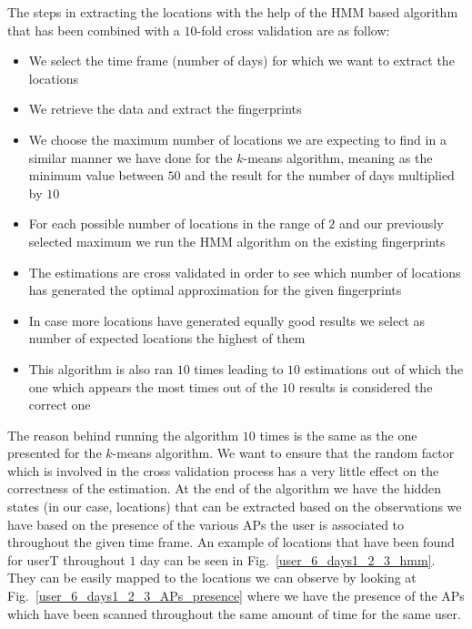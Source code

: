The steps in extracting the locations with the help of the HMM based algorithm
that has been combined with a $10$-fold cross validation are as follow:
\begin{itemize}
  \item We select the time frame (number of days) for which we want to extract
  the locations
  \item We retrieve the data and extract the fingerprints
  \item We choose the maximum number of locations we are expecting to find in a
  similar manner we have done for the $k$-means algorithm, meaning as the
  minimum value between $50$ and the result for the number of days multiplied
  by $10$
  \item For each possible number of locations in the range of $2$ and our
  previously selected maximum we run the HMM algorithm on the existing
  fingerprints
  \item The estimations are cross validated in order to see which number of
  locations has generated the optimal approximation for the given fingerprints
  \item In case more locations have generated equally good results we select
  as number of expected locations the highest of them
  \item This algorithm is also ran $10$ times leading to $10$ estimations out of
  which the one which appears the most times out of the $10$ results is
  considered the correct one
\end{itemize}

The reason behind running the algorithm $10$ times is the same as the one
presented for the $k$-means algorithm. We want to ensure that the random factor
which is involved in the cross validation process has a very little effect on the
correctness of the estimation. At the end of the algorithm we have the hidden
states (in our case, locations) that can be extracted based on the observations
we have based on the presence of the various APs the user is associated to
throughout the given time frame. An example of locations that have been found
for userT throughout $1$ day can be seen in Fig.~\ref{user_6_days1_2_3_hmm}.
They can be easily mapped to the locations we can observe by looking at
Fig.~\ref{user_6_days1_2_3_APs_presence} where we have the presence of the
APs which have been scanned throughout the same amount of time for the same user.

